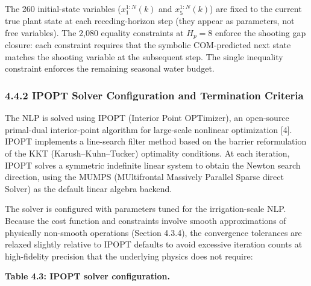 The 260 initial-state variables (\(x_1^{1:N}(k)\) and \(x_5^{1:N}(k)\))
are fixed to the current true plant state at each receding-horizon step
(they appear as parameters, not free variables). The 2,080 equality
constraints at \(H_p = 8\) enforce the shooting gap closure: each
constraint requires that the symbolic COM-predicted next state matches
the shooting variable at the subsequent step. The single inequality
constraint enforces the remaining seasonal water budget.

\subsubsection{4.4.2 IPOPT Solver Configuration and Termination
Criteria}\label{ipopt-solver-configuration-and-termination-criteria}

The NLP is solved using IPOPT (Interior Point OPTimizer), an open-source
primal-dual interior-point algorithm for large-scale nonlinear
optimization {[}4{]}. IPOPT implements a line-search filter method based
on the barrier reformulation of the KKT (Karush--Kuhn--Tucker)
optimality conditions. At each iteration, IPOPT solves a symmetric
indefinite linear system to obtain the Newton search direction, using
the MUMPS (MUltifrontal Massively Parallel Sparse direct Solver) as the
default linear algebra backend.

The solver is configured with parameters tuned for the irrigation-scale
NLP. Because the cost function and constraints involve smooth
approximations of physically non-smooth operations (Section 4.3.4), the
convergence tolerances are relaxed slightly relative to IPOPT defaults
to avoid excessive iteration counts at high-fidelity precision that the
underlying physics does not require:

\textbf{Table 4.3: IPOPT solver configuration.}

